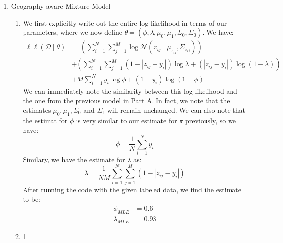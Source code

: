 \documentclass[12pt]{article}
\begin{document}
\begin{enumerate}[label=(\Alph*)]
\begin{enumerate}[label=(\roman*)]
  	\end{enumerate}
  \item Geography-aware Mixture Model
  	\begin{enumerate}[label=(\roman*)]
  		\item We first explicitly write out the entire log likelihood in terms of our parameters, where we now define $\theta = (\phi, \lambda, \mu_0, \mu_1, \Sigma_0, \Sigma_0)$. We have:
  		\begin{align*}
  			\ell\ell(\mathcal{D}\mid \theta) &= \left(\sum_{i=1}^N \sum_{j=1}^M \log \mathcal{N}(x_{ij} \mid \mu_{z_{ij}}, \Sigma_{z_{ij}})\right) \\
  			&+ \left(\sum_{i=1}^N \sum_{j=1}^M (1 - |z_{ij} - y_i|)\log \lambda + (|z_{ij} - y_i|)\log(1 - \lambda) \right) \\
  			&+ M\sum_{i=1}^N y_i \log \phi + (1-y_i)\log (1 -\phi)
  		\end{align*}
  		We can immediately note the similarity between this log-likelihood and the one from the previous model in Part A. In fact, we note that the estimates $\mu_0, \mu_1, \Sigma_0$ and $\Sigma_1$ will remain unchanged. We can also note that the estimat for $\phi$ is very similar to our estimate for $\pi$ previously, so we have:
  		$$
  			\phi = \frac{1}{N}\sum_{i=1}^N y_i
  		$$
  		Similary, we have the estimate for $\lambda$ as:
  		$$
  			\lambda = \frac{1}{NM} \sum_{i=1}^N \sum_{j=1}^M (1 - |z_{ij} - y_i|)
  		$$
  		After running the code with the given labeled data, we find the estimate to be:
  		\begin{align*}
				\phi_{MLE} &= 0.6 \\
				\lambda_{MLE} &= 0.93
  		\end{align*}
  		\item 1
  	\end{enumerate}
\end{enumerate}
\end{document}
